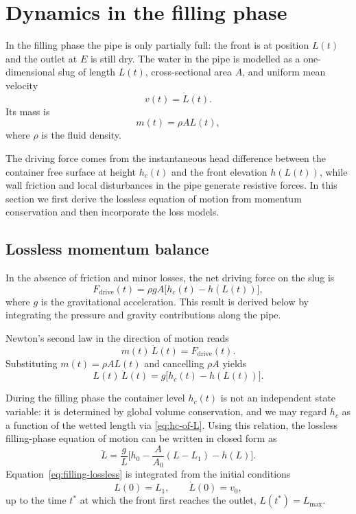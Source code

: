\documentclass[11pt]{article}
\begin{document}
\section{Dynamics in the filling phase}

In the filling phase the pipe is only partially full: the front is at position $L(t)$ and the outlet
at $E$ is still dry. The water in the pipe is modelled as a one-dimensional slug of length $L(t)$,
cross-sectional area $A$, and uniform mean velocity
\[
  v(t) = \dot L(t).
\]
Its mass is
\[
  m(t) = \rho A L(t),
\]
where $\rho$ is the fluid density.

The driving force comes from the instantaneous head difference between the container
free surface at height $h_c(t)$ and the front elevation $h(L(t))$, while wall friction and local
disturbances in the pipe generate resistive forces. In this section we first derive the lossless
equation of motion from momentum conservation and then incorporate the loss models.

\subsection{Lossless momentum balance}

In the absence of friction and minor losses, the net driving force on the slug is
\[
  F_{\text{drive}}(t) = \rho g A \bigl[h_c(t) - h(L(t))\bigr],
\]
where $g$ is the gravitational acceleration. This result is derived below by integrating the
pressure and gravity contributions along the pipe.

Newton's second law in the direction of motion reads
\[
  m(t)\,\ddot L(t) = F_{\text{drive}}(t).
\]
Substituting $m(t) = \rho A L(t)$ and cancelling $\rho A$ yields
\[
  L(t)\,\ddot L(t) = g\bigl[h_c(t) - h(L(t))\bigr].
\]

During the filling phase the container level $h_c(t)$ is not an independent state variable:
it is determined by global volume conservation, and we may regard $h_c$ as a function of the wetted length via \eqref{eq:hc-of-L}.
Using this relation, the lossless filling-phase equation of motion can be written in closed form as
\begin{equation}
  \ddot L
  = \frac{g}{L}\Big[h_0 - \frac{A}{A_0}(L - L_1) - h(L)\Big].
  \label{eq:filling-lossless}
\end{equation}
Equation~\eqref{eq:filling-lossless} is integrated from the initial conditions
\[
  L(0) = L_1,\qquad \dot L(0) = v_0,
\]
up to the time $t^*$ at which the front first reaches the outlet, $L(t^*) = L_{\max}$.
\end{document}

